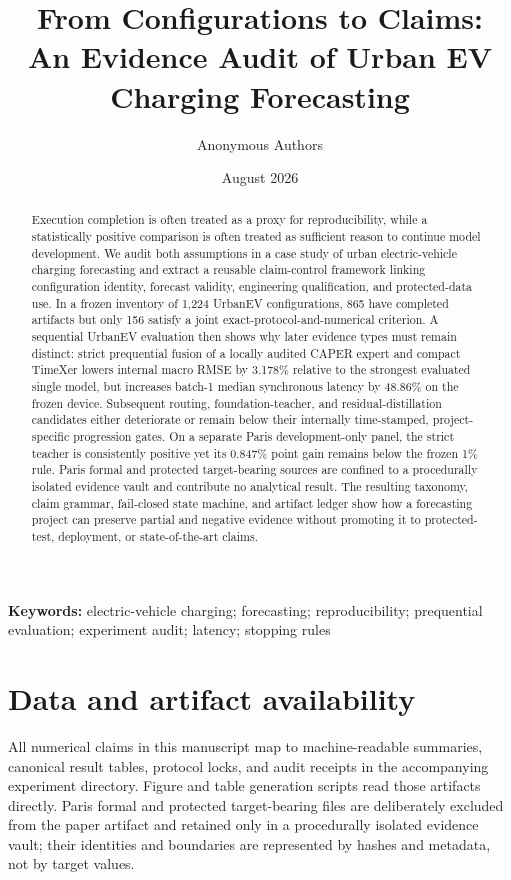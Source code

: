 \documentclass[11pt]{article}
\title{From Configurations to Claims:\\An Evidence Audit of Urban EV Charging Forecasting}
\author{Anonymous Authors}
\date{August 2026}
\begin{document}
\maketitle

\begin{abstract}
Execution completion is often treated as a proxy for reproducibility, while a statistically positive comparison is often treated as sufficient reason to continue model development.  We audit both assumptions in a case study of urban electric-vehicle charging forecasting and extract a reusable claim-control framework linking configuration identity, forecast validity, engineering qualification, and protected-data use.  In a frozen inventory of 1,224 UrbanEV configurations, 865 have completed artifacts but only 156 satisfy a joint exact-protocol-and-numerical criterion.  A sequential UrbanEV evaluation then shows why later evidence types must remain distinct: strict prequential fusion of a locally audited CAPER expert and compact TimeXer lowers internal macro RMSE by 3.178\% relative to the strongest evaluated single model, but increases batch-1 median synchronous latency by 48.86\% on the frozen device.  Subsequent routing, foundation-teacher, and residual-distillation candidates either deteriorate or remain below their internally time-stamped, project-specific progression gates.  On a separate Paris development-only panel, the strict teacher is consistently positive yet its 0.847\% point gain remains below the frozen 1\% rule.  Paris formal and protected target-bearing sources are confined to a procedurally isolated evidence vault and contribute no analytical result.  The resulting taxonomy, claim grammar, fail-closed state machine, and artifact ledger show how a forecasting project can preserve partial and negative evidence without promoting it to protected-test, deployment, or state-of-the-art claims.
\end{abstract}

\noindent\textbf{Keywords:} electric-vehicle charging; forecasting; reproducibility; prequential evaluation; experiment audit; latency; stopping rules










\section*{Data and artifact availability}
All numerical claims in this manuscript map to machine-readable summaries, canonical result tables, protocol locks, and audit receipts in the accompanying experiment directory.  Figure and table generation scripts read those artifacts directly.  Paris formal and protected target-bearing files are deliberately excluded from the paper artifact and retained only in a procedurally isolated evidence vault; their identities and boundaries are represented by hashes and metadata, not by target values.
\end{document}
